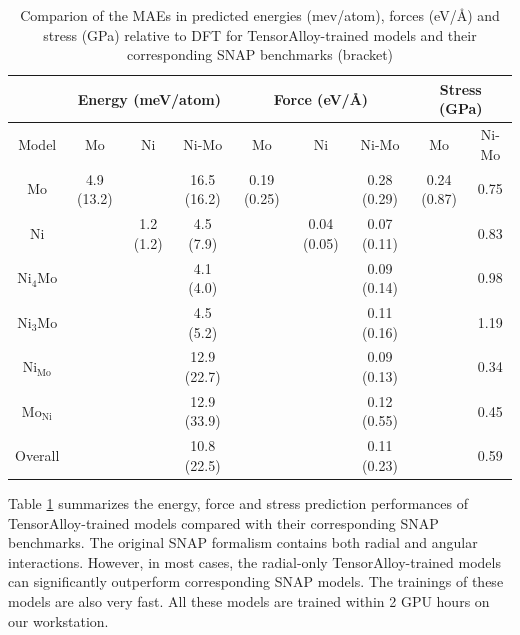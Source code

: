 \documentclass[preprint]{revtex4-2}
\begin{document}
% 
%
\begin{table}[h]
\centering
\begin{tabular}{cccc|ccc|cc}
\hline
 & \multicolumn{3}{c|}{Energy (meV/atom)} & \multicolumn{3}{c|}{Force (eV/\AA)}
 & \multicolumn{2}{c}{Stress (GPa)} \\
\hline
Model & Mo & Ni & Ni-Mo & Mo & Ni & Ni-Mo & Mo & Ni-Mo \\
\hline
Mo & 4.9 (13.2) & & 16.5 (16.2) & 0.19 (0.25) & & 0.28 (0.29) & 0.24 (0.87) 
   & 0.75 \\
Ni & & 1.2 (1.2) & 4.5 (7.9) & & 0.04 (0.05) & 0.07 (0.11) & & 0.83 \\
Ni$_4$Mo & & & 4.1 (4.0) & & & 0.09 (0.14) & & 0.98 \\ 
Ni$_3$Mo & & & 4.5 (5.2) & & & 0.11 (0.16) & & 1.19 \\
Ni$_{\mathrm{Mo}}$ & & & 12.9 (22.7) & & & 0.09 (0.13) & & 0.34 \\
Mo$_{\mathrm{Ni}}$ & & & 12.9 (33.9) & & & 0.12 (0.55) & & 0.45 \\
Overall & & & 10.8 (22.5) & & & 0.11 (0.23) & & 0.59 \\
\hline
\end{tabular}

\caption{\label{table:MAE}
Comparion of the MAEs in predicted energies (mev/atom), forces (eV/\AA) and 
stress (GPa) relative to DFT for TensorAlloy-trained models and their
corresponding SNAP benchmarks (bracket)}
\end{table}

Table \ref{table:MAE} summarizes the energy, force and stress prediction 
performances of TensorAlloy-trained models compared with their corresponding 
SNAP benchmarks. The original SNAP formalism contains both radial and angular 
interactions. However, in most cases, the radial-only TensorAlloy-trained 
models can significantly outperform corresponding SNAP models. The trainings of 
these models are also very fast. All these models are trained within 2 GPU hours
on our workstation. 
\end{document}
